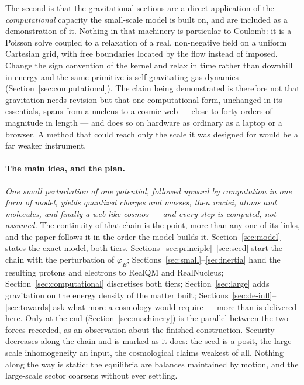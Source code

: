 \documentclass[11pt]{article}
\begin{document}
The second is that the gravitational sections are a direct application of the \emph{computational} capacity the
small-scale model is built on, and are included as a demonstration of it. Nothing in that machinery is particular
to Coulomb: it is a Poisson solve coupled to a relaxation of a real, non-negative field on a uniform Cartesian
grid, with free boundaries located by the flow instead of imposed. Change the sign convention of the kernel and
relax in time rather than downhill in energy and the same primitive is self-gravitating gas dynamics
(Section~\ref{sec:computational}). The claim being demonstrated is therefore not that gravitation needs revision
but that one computational form, unchanged in its essentials, spans from a nucleus to a cosmic web --- close to
forty orders of magnitude in length --- and does so on hardware as ordinary as a laptop or a browser. A method that could reach only the scale
it was designed for would be a far weaker instrument.

\paragraph{The main idea, and the plan.} \emph{One small perturbation of one potential, followed upward by
computation in one form of model, yields quantized charges and masses, then nuclei, atoms and molecules, and
finally a web-like cosmos --- and every step is computed, not assumed.} The continuity of that chain is the point,
more than any one of its links, and the paper follows it in the order the model builds it.
Section~\ref{sec:model} states the exact model, both
tiers. Sections~\ref{sec:principle}--\ref{sec:seed} start the chain with the perturbation of $\varphi_E$;
Sections~\ref{sec:small}--\ref{sec:inertia} hand the resulting protons and electrons to RealQM and RealNucleus;
Section~\ref{sec:computational} discretises both tiers; Section~\ref{sec:large} adds gravitation on the energy
density of the matter built; Sections~\ref{sec:de-infl}--\ref{sec:towards} ask what more a cosmology would require
--- more than is delivered here. Only at the end (Section~\ref{sec:machinery}) is the parallel between the two
forces recorded, as an observation about the finished construction. Security decreases along the chain and is
marked as it does: the seed is a posit, the large-scale inhomogeneity an input, the cosmological claims weakest of
all. Nothing along the way is static: the equilibria are balances maintained by motion, and the large-scale sector
coarsens without ever settling.
\end{document}
